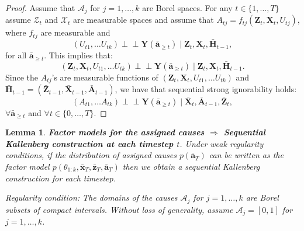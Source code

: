 \documentclass{article}
\newtheorem{lemma}{Lemma}
\newcommand{\vc}[1]{\mathbf{#1}}
\newcommand{\ci}{\perp\!\!\!\perp}
\newcommand{\cl}[1]{\mathcal{#1}}
\newcommand{\hist}[1]{\bar{\vc{#1}}}
\begin{document}
	\begin{proof}
	Assume that $\cl{A}_j$ for $ j=1,\dots, k$ are Borel spaces. For any $t \in \{1, \dots, T\}$  assume $\cl{Z}_t$ and $\cl{X}_t$ are measurable spaces and assume that $A_{tj} = f_{tj}(\vc{Z}_t, \vc{X}_{t}, U_{tj})$, where $f_{tj}$ are measurable and 
	\begin{equation}
	(U_{t1}, \dots U_{tk}) \ci  \vc{Y}(\hist{a}_{\geq t}) \mid \vc{Z}_t, \vc{X}_{t}, \hist{H}_{t-1},
	\end{equation} 
	for all $\hist{a}_{\geq t}$. This implies that:
	\begin{equation}
	(\vc{Z}_t, \vc{X}_{t}, U_{t1}, \dots U_{tk}) \ci \vc{Y}(\hist{a}_{\geq t}) \mid \vc{Z}_t, \vc{X}_{t}, \hist{H}_{t-1}.
	\end{equation} 
	Since the $A_{tj}$'s are measurable functions of $(\vc{Z}_t, \vc{X}_{t}, U_{t1}, \dots U_{tk})$ and $\hist{H}_{t-1} = (\hist{Z}_{t-1}, \hist{X}_{t-1}, \hist{A}_{t-1})$,  we have that sequential strong ignorability holds:
	\begin{equation}
	(A_{t1}, \dots A_{tk}) \ci \vc{Y}(\hist{a}_{\geq t}) \mid \hist{X}_t, \hist{A}_{t-1}, \hist{Z}_t,
	\end{equation} 
	$ \forall \hist{a}_{\geq t}$ and $\forall t\in \{0, \dots, T\}$.
	\end{proof}
	
	\begin{lemma}
	\textbf{Factor models for the assigned causes $\Rightarrow$ Sequential Kallenberg construction at each timestep $t$}. Under weak regularity conditions, if the  distribution of assigned causes $p(\hist{a}_T)$ can be written as the factor model $p(\theta_{1:k}, \hist{x}_T, \hist{z}_T,  \hist{a}_T)$ then we obtain  a sequential Kallenberg construction for each timestep.
	
	Regularity condition: The domains of the causes $\cl{A}_j$ for $j=1, \dots, k$ are Borel subsets of compact intervals. Without loss of generality, assume $\cl{A}_j = [0, 1]$ for $j=1, \dots, k$.
	\end{lemma}
	
\end{document}

